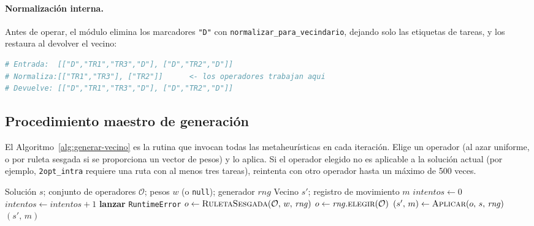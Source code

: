 \documentclass[11pt,a4paper]{article}
\theoremstyle{definition}
\theoremstyle{remark}
\begin{document}
\paragraph{Normalización interna.}
Antes de operar, el módulo elimina los marcadores \texttt{"D"} con
\texttt{normalizar\_para\_vecindario}, dejando solo las etiquetas de tareas,
y los restaura al devolver el vecino:
\begin{lstlisting}[language=Python]
# Entrada:  [["D","TR1","TR3","D"], ["D","TR2","D"]]
# Normaliza:[["TR1","TR3"], ["TR2"]]      <- los operadores trabajan aqui
# Devuelve: [["D","TR1","TR3","D"], ["D","TR2","D"]]
\end{lstlisting}

\subsection{Procedimiento maestro de generación}
\label{subsec:gen-maestro}

El Algoritmo~\ref{alg:generar-vecino} es la rutina que invocan todas las
metaheurísticas en cada iteración. Elige un operador (al azar uniforme, o
por ruleta sesgada si se proporciona un vector de pesos) y lo aplica. Si el
operador elegido no es aplicable a la solución actual (por ejemplo,
\texttt{2opt\_intra} requiere una ruta con al menos tres tareas), reintenta
con otro operador hasta un máximo de 500 veces.

\begin{algorithm}[h]
\caption{\textsc{GenerarVecino} --- rutina maestra de generación de vecinos}
\label{alg:generar-vecino}
\begin{algorithmic}[1]
\Require Solución $s$; conjunto de operadores $\mathcal{O}$; pesos $w$ (o \texttt{null}); generador $\mathit{rng}$
\Ensure Vecino $s'$; registro de movimiento $m$
\State $\mathit{intentos} \gets 0$
\Repeat
  \State $\mathit{intentos} \gets \mathit{intentos} + 1$
     \State \textbf{lanzar} \texttt{RuntimeError} 
  \EndIf
     \State $o \gets \textsc{RuletaSesgada}(\mathcal{O},\, w,\, \mathit{rng})$ 
  \Else
     \State $o \gets \mathit{rng}.\textsc{elegir}(\mathcal{O})$ 
  \EndIf
  \State $(s',\, m) \gets \textsc{Aplicar}(o,\, s,\, \mathit{rng})$ 
\State \Return $(s',\, m)$
\end{algorithmic}
\end{algorithm}
\end{document}
